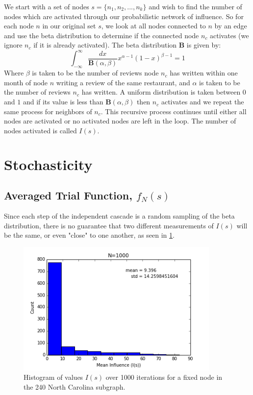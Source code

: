 \documentclass{article}
\begin{document}
	We start with a set of nodes $s = \{n_1,n_2,...,n_k\}$ and wish to find the number of nodes which are activated through our probabilistic network of influence. So for each node $n$ in our original set $s$, we look at all nodes connected to $n$ by an edge and use the beta distribution to determine if the connected node $n_c$ activates (we ignore $n_c$ if it is already activated). The beta distribution $\boldsymbol{B}$ is given by:
	\begin{equation}
	\boxed{
			\int_{-\infty}^{\infty} \frac{dx}{\boldsymbol{B}(\alpha,\beta)}x^{\alpha-1}(1-x)^{\beta - 1} = 1
		}
	\end{equation}
	Where $\beta$ is taken to be the number of reviews node $n_c$ has written within one month of node $n$ writing a review of the same restaurant, and $\alpha$ is taken to be the number of reviews $n_c$ has written. A uniform distribution is taken between $0$ and $1$ and if its value is less than $\boldsymbol{B}(\alpha,\beta)$ then $n_c$ activates and we repeat the same process for neighbors of $n_c$. This recursive process continues until either all nodes are activated or no activated nodes are left in the loop. The number of nodes activated is called $I(s)$.
	
	
	\section{Stochasticity}
	
	\subsection{Averaged Trial Function, $f_N(s)$}
	
	Since each step of the independent cascade is a random sampling of the beta distribution, there is no guarantee that two different measurements of $I(s)$ will be the same, or even "close" to one another, as seen in \ref{fig:Inf_1000}. 
	
	\begin{figure}[h!]
		\centering
		\includegraphics[width=100mm]{N1000_influence.png}
		\caption{Histogram of values $I(s)$ over 1000 iterations for a fixed node in the 240 North Carolina subgraph.}
		\label{fig:Inf_1000}
	\end{figure}
	
\end{document}
